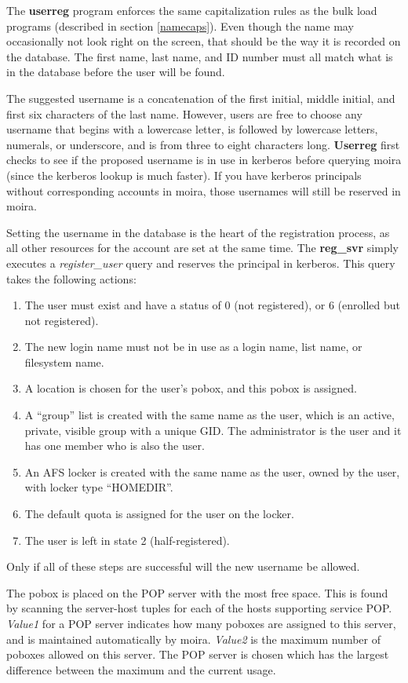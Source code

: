 \documentclass{book}
\begin{document}
The {\bf userreg} program enforces the same capitalization rules as
the bulk load programs (described in section \ref{namecaps}).  Even
though the name may occasionally not look right on the screen, that
should be the way it is recorded on the database.  The first name,
last name, and ID number must all match what is in the database before
the user will be found.

The suggested username is a concatenation of the first initial, middle
initial, and first six characters of the last name.  However, users
are free to choose any username that begins with a lowercase letter, is
followed by lowercase letters, numerals, or underscore, and is from
three to eight characters long.  {\bf Userreg} first checks to see if
the proposed username is in use in kerberos before querying moira
(since the kerberos lookup is much faster).  If you have kerberos
principals without corresponding accounts in moira, those usernames
will still be reserved in moira.

Setting the username in the database is the heart of the registration
process, as all other resources for the account are set at the same
time.  The {\bf reg\_svr} simply executes a {\em register\_user} query and
reserves the principal in kerberos.  This query takes the following
actions:
\begin{enumerate}
\item The user must exist and have a status of 0 (not registered), or 6
(enrolled but not registered).
\item The new login name must not be in use as a login name, list name, or
filesystem name.
\item A location is chosen for the user's pobox, and this pobox is assigned.
\item A ``group'' list is created with the same name as the user, which is
an active, private, visible group with a unique GID.  The
administrator is the user and it has one member who is also the user.
\item An AFS locker is created with the same name as the user, owned
by the user, with locker type ``HOMEDIR''.
\item The default quota is assigned for the user on the locker.
\item The user is left in state 2 (half-registered).
\end{enumerate}
Only if all of these steps are successful will the new username be
allowed.

The pobox is placed on the POP server with the most free space.  This
is found by scanning the server-host tuples for each of the hosts
supporting service POP.  {\em Value1} for a POP server indicates how
many poboxes are assigned to this server, and is maintained
automatically by moira.  {\em Value2} is the maximum number of poboxes
allowed on this server.  The POP server is chosen which has the
largest difference between the maximum and the current usage.
\end{document}
